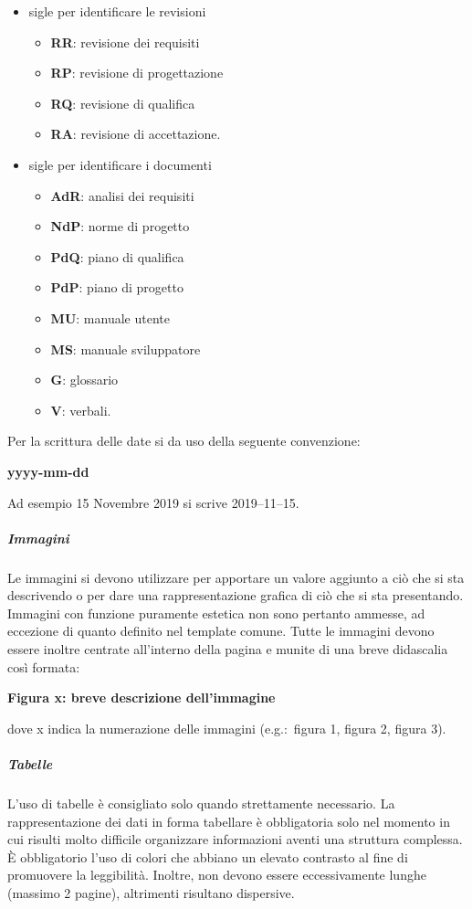 \documentclass[../norme-di-progetto.tex]{subfiles}
\begin{document}
\begin{itemize}
  \item sigle per identificare le revisioni
        \begin{itemize}
          \item \textbf{RR}: revisione dei requisiti
          \item \textbf{RP}: revisione di progettazione
          \item \textbf{RQ}: revisione di qualifica
          \item \textbf{RA}: revisione di accettazione.
        \end{itemize}
  \item sigle per identificare i documenti
        \begin{itemize}
          \item \textbf{AdR}: analisi dei requisiti
          \item \textbf{NdP}: norme di progetto
          \item \textbf{PdQ}: piano di qualifica
          \item \textbf{PdP}: piano di progetto
          \item \textbf{MU}: manuale utente
          \item \textbf{MS}: manuale sviluppatore
          \item \textbf{G}: glossario
          \item \textbf{V}: verbali.
        \end{itemize}
\end{itemize}
Per la scrittura delle date si da uso della seguente convenzione:
\begin{center}
          \textbf{yyyy-mm-dd}
\end{center}
Ad esempio 15 Novembre 2019 si scrive 2019--11--15.
\subparagraph{Immagini}%
\label{subp:immagini}
Le immagini si devono utilizzare per apportare un valore aggiunto a ciò che si sta descrivendo o per dare una rappresentazione grafica di ciò che si sta presentando.
Immagini con funzione puramente estetica non sono pertanto ammesse, ad eccezione di quanto definito nel template comune.
Tutte le immagini devono essere inoltre centrate all'interno della pagina e munite di una breve didascalia così formata:
\begin{center}
  \textbf{Figura x: breve descrizione dell'immagine}
\end{center}
dove x indica la numerazione delle immagini (e.g.:\ figura 1, figura 2, figura 3).

\subparagraph{Tabelle}%
\label{subp:tabelle}
L'uso di tabelle è consigliato solo quando strettamente necessario. La rappresentazione dei dati in forma tabellare è obbligatoria solo nel momento in cui risulti molto difficile organizzare informazioni aventi una struttura complessa. È obbligatorio l'uso di colori che abbiano un elevato contrasto al fine di promuovere la leggibilità. Inoltre, non devono essere eccessivamente lunghe (massimo 2 pagine), altrimenti risultano dispersive.
\end{document}
